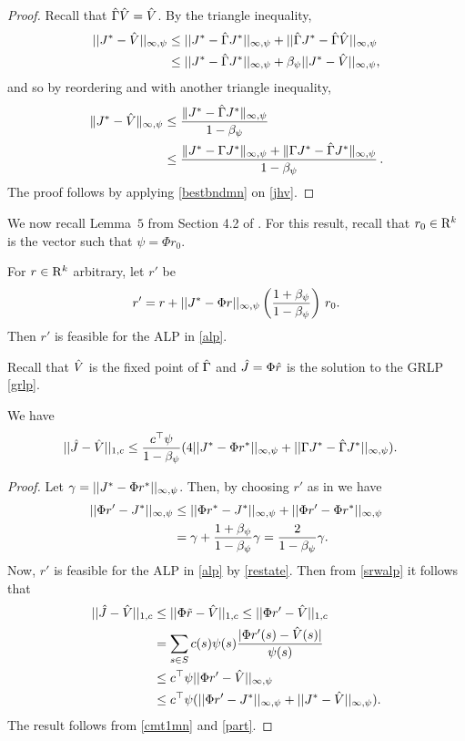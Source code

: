 \begin{proof}
Recall that $\hat{\Gamma} \hat{V}=\hat{V}$. By the triangle inequality,
\begin{align*}
||J^*-\hat{V}||_{\infty,\psi}
& \leq ||J^*-\hat{\Gamma} J^*||_{\infty,\psi}+||\hat{\Gamma} J^*-\hat{\Gamma} \hat{V}||_{\infty,\psi}\\
&\leq ||J^*-\hat{\Gamma} J^*||_{\infty,\psi}+\beta_\psi || J^*- \hat{V}||_{\infty,\psi},
\end{align*}
and so by reordering and with another triangle inequality,
\begin{align}\label{jhv}
\norm{J^*-\hv}_{\mn} \nn
&\le \frac{\norm{ J^*-\hg J^*}_{\mn}}{1-\beta_\psi}\nn\\
&\le \frac{\norm{ J^*-\Gamma J^*}_{\mn}+\norm{\Gamma J^* - \hg J^*}_{\mn}}{1-\beta_\psi}\,.
\end{align}
The proof follows by applying \cref{bestbndmn} on \eqref{jhv}.
\end{proof}
We now recall Lemma~$5$ from Section 4.2 of \cite{ALP}. 
For this result, recall that $r_0 \in \mathrm{R}^k$ is the vector such that $\psi = \Phi r_0$.
\begin{lemma}\label{restate}
For  $r \in \mathrm{R}^k$ arbitrary, let $r'$ be
\begin{align}
 r'= r+||J^*-\Phi r||_{\infty,\psi} \left(\frac{1+\beta_{\psi}}{1-\beta_{\psi}}\right)\, r_0.
\end{align}
Then $r'$ is feasible for the ALP in \eqref{alp}.
\end{lemma}
Recall that $\hat{V}$ is the fixed point of $\hat{\Gamma}$ and $\hat{J}=\Phi \hat{r}$ is the solution to the GRLP
\eqref{grlp}. 
\begin{theorem}\label{mt2mn}
We have
\begin{align}
||\hat{J}-\hat{V}||_{1,c}&\leq \frac{c^\top \psi}{1-\beta_\psi}(4||J^*-\Phi r^*||_{\infty,\psi}\nonumber
+||\Gamma J^*-\hat{\Gamma} J^*||_{\infty,\psi}).
\end{align}
\end{theorem}
\begin{proof}
Let $\gamma=||J^*-\Phi r^*||_{\infty,\psi}$. 
Then, by choosing $r'$ as in  we have
\begin{align}
||\Phi r'-J^*||_{\mn}\nn
&\leq ||\Phi r^*-J^*||_{\mn}+||\Phi r'-\Phi r^*||_{\mn}\nn\\
&=\gamma+\frac{1+\beta_\psi}{1-\beta_\psi}\gamma
	=\frac{2}{1-\beta_\psi}\gamma.
\label{part}
\end{align}
Now, $r'$ is feasible for the ALP in \eqref{alp} by \cref{restate}.
Then from \cref{srwalp} it follows that
\begin{align}
||\hat{J}-\hat{V}||_{1,c}
&\leq||\Phi \tilde{r}-\hat{V}||_{1,c}\leq||\Phi r'-\hat{V}||_{1,c}\nonumber\\
&=\sum_{s\in S}c(s)\psi(s)\frac{|\Phi r'(s)-\hat{V}(s)|}{\psi(s)}\nonumber\\
&\leq c^\top \psi ||\Phi r'-\hat{V}||_{\infty,\psi}\nonumber\\
&\leq c^\top \psi (||\Phi r'-J^*||_{\infty,\psi}+||J^*-\hat{V}||_{\infty,\psi}).\nonumber
\end{align}
The result follows from \cref{cmt1mn} and \eqref{part}.
\end{proof}
